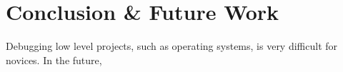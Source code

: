 


\section{Conclusion \& Future Work}



Debugging low level projects, such as operating systems, is very difficult for novices.
%
In the future, 